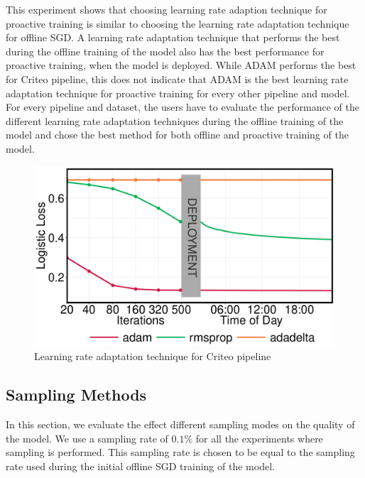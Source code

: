 This experiment shows that choosing learning rate adaption technique for proactive training is similar to choosing the learning rate adaptation technique for offline SGD.
A learning rate adaptation technique that performs the best during the offline training of the model also has the best performance for proactive training, when the model is deployed.
While ADAM performs the best for Criteo pipeline, this does not indicate that ADAM is the best learning rate adaptation technique for proactive training for every other pipeline and model.
For every pipeline and dataset, the users have to evaluate the performance of the different learning rate adaptation techniques during the offline training of the model and chose the best method for both offline and proactive training of the model.

\begin{figure}[h!]
\includegraphics[width=\columnwidth]{../images/experiment-results/criteo-learning-rate-experiment.pdf}
\caption{Learning rate adaptation technique for Criteo pipeline}
\label{fig:criteo-learning-rate}
\end{figure}

\subsection{Sampling Methods}
In this section, we evaluate the effect different sampling modes on the quality of the model.
We use a sampling rate of $0.1\%$ for all the experiments where sampling is performed.
This sampling rate is chosen to be equal to the sampling rate used during the initial offline SGD training of the model.

